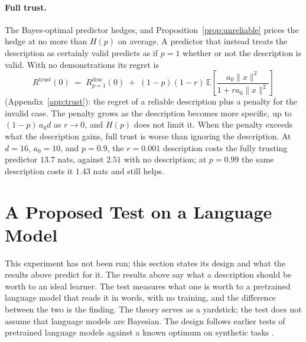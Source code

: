 \documentclass[10pt]{article}
\newcommand{\E}{\mathbb{E}}
\begin{document}
\paragraph{Full trust.} The Bayes-optimal predictor hedges, and Proposition~\ref{prop:unreliable} prices the hedge at no more than $H(p)$ on average. A predictor that instead treats the description as certainly valid predicts as if $p = 1$ whether or not the description is valid. With no demonstrations its regret is
\begin{equation}\label{eq:trust}
    R^{\mathrm{trust}}(0) \;=\; R^{\mathrm{desc}}_{p=1}(0) \;+\; (1-p)(1-r)\,\E\!\left[\frac{a_0\|x\|^2}{1 + r a_0 \|x\|^2}\right]
\end{equation}
(Appendix~\ref{app:trust}): the regret of a reliable description plus a penalty for the invalid case. The penalty grows as the description becomes more specific, up to $(1-p)\,a_0 d$ as $r \to 0$, and $H(p)$ does not limit it. When the penalty exceeds what the description gains, full trust is worse than ignoring the description. At $d = 16$, $a_0 = 10$, and $p = 0.9$, the $r = 0.001$ description costs the fully trusting predictor $13.7$ nats, against $2.51$ with no description; at $p = 0.99$ the same description costs it $1.43$ nats and still helps.

\section{A Proposed Test on a Language Model}\label{sec:llm}
This experiment has not been run; this section states its design and what the results above predict for it. The results above say what a description should be worth to an ideal learner. The test measures what one is worth to a pretrained language model that reads it in words, with no training, and the difference between the two is the finding. The theory serves as a yardstick; the test does not assume that language models are Bayesian. The design follows earlier tests of pretrained language models against a known optimum on synthetic tasks \citep{gupta2025, akata2026}.
\end{document}
